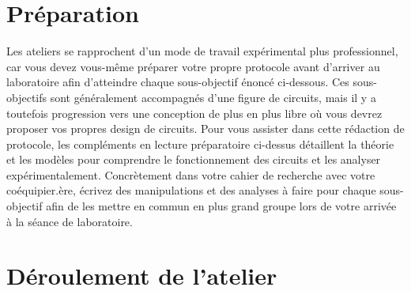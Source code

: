 \documentclass[canadien,12pt,oneside,letterpaper]{article}
\begin{document}

\section{Préparation}

\setlength{\parskip}{1ex plus 0.5ex minus 0.2ex}
Les ateliers se rapprochent d'un mode de travail expérimental plus professionnel, car vous devez vous-même préparer votre propre protocole avant d'arriver au laboratoire afin d'atteindre chaque sous-objectif énoncé ci-dessous. Ces sous-objectifs sont généralement accompagnés d'une figure de circuits, mais il y a toutefois progression vers une conception de plus en plus libre où vous devrez proposer vos propres design de circuits. Pour vous assister dans cette rédaction de protocole, les compléments en lecture préparatoire ci-dessus détaillent la théorie et les modèles pour comprendre le fonctionnement des circuits et les analyser expérimentalement. Concrètement dans votre cahier de recherche avec votre coéquipier.ère, écrivez des manipulations et des analyses à faire pour chaque sous-objectif afin de les mettre en commun en plus grand groupe lors de votre arrivée à la séance de laboratoire. 

\section{Déroulement de l’atelier}
\end{document}
